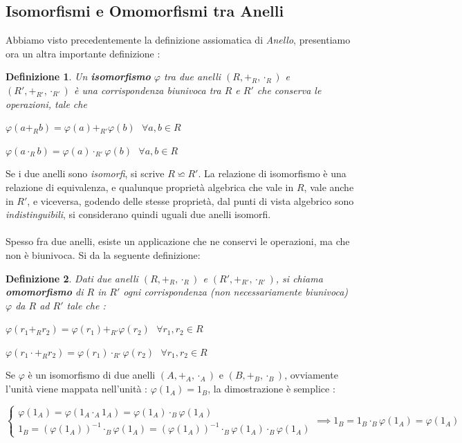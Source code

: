 \documentclass[12pt, letterpaper]{article}
\begin{document}
\subsection{Isomorfismi e Omomorfismi tra Anelli}
Abbiamo visto precedentemente la definizione assiomatica di \textit{Anello}, presentiamo ora un altra importante 
definizione : \newtheorem{deff}{Definizione}
\begin{deff}
    Un \textbf{isomorfismo}  \(\varphi\) tra due anelli \((R,+_R,\cdot_R)\) e \((R',+_{R'},\cdot_{R'})\) è una corrispondenza biunivoca tra \(R\) e \(R'\) che 
    conserva le operazioni, tale che \begin{center}
        \(\varphi(a+_Rb)=\varphi(a)+_{R'} \varphi(b)\text{ } \forall a,b\in R  \)
    \end{center}
    \begin{center}
        \(\varphi(a\cdot_R b)=\varphi(a)\cdot_{R'} \varphi(b)\text{ } \forall a,b\in R  \)
    \end{center}
\end{deff}
Se i due anelli sono \textit{isomorfi}, si scrive \(R\backsimeq  R'\). La relazione di isomorfismo è una relazione 
di equivalenza, e qualunque proprietà algebrica che vale in \(R\), vale anche in \(R'\), e viceversa, godendo delle 
stesse proprietà, dal punti di vista algebrico sono \textit{indistinguibili}, si considerano quindi uguali due 
anelli isomorfi. \\\hphantom{.}\\
Spesso fra due anelli, esiste un applicazione che ne conservi le operazioni, ma che non è biunivoca. Si da la seguente 
definizione:\begin{deff}
    Dati due anelli \((R,+_R,\cdot_R)\) e \((R',+_{R'},\cdot_{R'})\), si chiama \textbf{omomorfismo} di \(R\) in \(R'\) ogni 
    corrispondenza (non necessariamente biunivoca) \(\varphi\) da \(R\) ad \(R'\) tale che :
    \begin{center}
        \(\varphi(r_1+_Rr_2)=\varphi(r_1)+_{R'} \varphi(r_2)\text{ } \forall r_1,r_2\in R  \)
    \end{center}
    \begin{center}
        \(\varphi(r_1\cdot+_R r_2)=\varphi(r_1)\cdot_{R'} \varphi(r_2) \text{ }\forall r_1,r_2\in R  \)
    \end{center}
\end{deff}
Se \(\varphi\) è un isomorfismo di due anelli \((A,+_A,\cdot_A)\) e \((B,+_B,\cdot_B)\), ovviamente 
l'unità viene mappata nell'unità : \(\varphi(1_A)=1_B\), la dimostrazione è semplice : \begin{center}
    \(
      \begin{cases}
        \varphi(1_A)=\varphi(1_A\cdot_A 1_A)=\varphi(1_A)\cdot_B \varphi(1_A)\\
        1_B=(\varphi(1_A))^{-1}\cdot_B\varphi(1_A) = (\varphi(1_A))^{-1}\cdot_B\varphi(1_A)\cdot_B\varphi(1_A)
      \end{cases}  
      \implies  1_B = 1_B \cdot_B \varphi(1_A) = \varphi(1_A) 
    \)
\end{center}   
\end{document}
